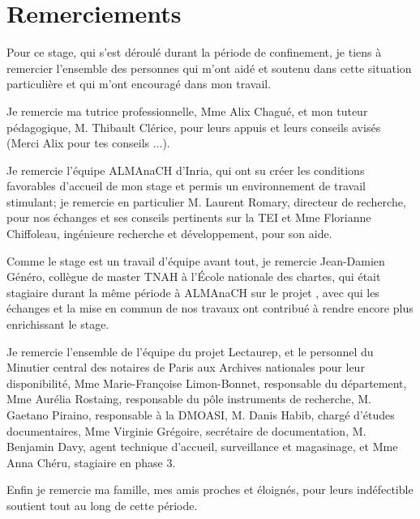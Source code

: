\chapter*{Remerciements}

Pour ce stage, qui s'est déroulé durant la période de confinement, je tiens à remercier l'ensemble des personnes qui m'ont aidé et soutenu dans cette situation particulière et qui m'ont encouragé dans mon travail.

Je remercie ma tutrice professionnelle, Mme Alix Chagué, et mon tuteur pédagogique, M. Thibault Clérice, pour leurs appuis et leurs conseils avisés (Merci Alix pour tes conseils ...).

Je remercie l'équipe ALMAnaCH d'Inria, qui ont su créer les conditions favorables d'accueil de mon stage et permis un environnement de travail stimulant; je remercie en particulier M. Laurent Romary, directeur de recherche, pour nos échanges et ses conseils pertinents sur la TEI et Mme Florianne Chiffoleau, ingénieure recherche et développement, pour son aide.

Comme le stage est un travail d'équipe avant tout, je remercie Jean-Damien Généro, collègue de master TNAH à l'École nationale des chartes, qui était stagiaire durant la même période à ALMAnaCH sur le projet , avec qui les échanges et la mise en commun de nos travaux ont contribué à rendre encore plus enrichissant le stage.

Je remercie l'ensemble de l'équipe du projet Lectaurep, et le personnel du Minutier central des notaires de Paris aux Archives nationales pour leur disponibilité, Mme Marie-Françoise Limon-Bonnet, responsable du département, Mme Aurélia Rostaing, responsable du pôle instruments de recherche, M. Gaetano Piraino, responsable à la DMOASI, M. Danis Habib, chargé d'études documentaires, Mme Virginie Grégoire, secrétaire de documentation, M. Benjamin Davy, agent technique d'accueil, surveillance et magasinage, et Mme Anna Chéru, stagiaire en phase 3. 

Enfin je remercie ma famille, mes amis proches et éloignés, pour leurs indéfectible soutient tout au long de cette période. 